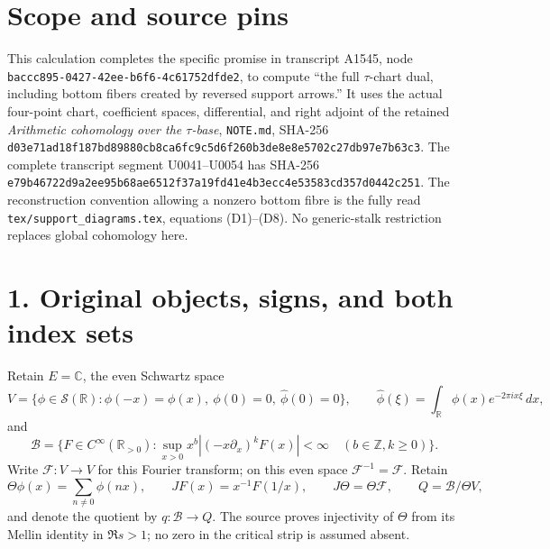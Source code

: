 


\section{Scope and source pins}\label{proof03:scope-and-source-pins}

This calculation completes the specific promise in transcript A1545,
node \texttt{baccc895-\allowbreak{}0427-\allowbreak{}42ee-\allowbreak{}b6f6-\allowbreak{}4c61752dfde2}, to compute ``the
full \ensuremath{\tau}-chart dual, including bottom fibers created by reversed support
arrows.'' It uses the actual four-point chart, coefficient spaces,
differential, and right adjoint of the retained \emph{Arithmetic
cohomology over the \ensuremath{\tau}-base}, \texttt{NOTE.md}, SHA-256
\texttt{d03e71ad\allowbreak{}18f187bd\allowbreak{}89880cb8\allowbreak{}ca6fc9c5\allowbreak{}d6f260b3\allowbreak{}de8e8e57\allowbreak{}02c27db9\allowbreak{}7e7b63c3}.
The complete transcript segment U0041--U0054 has SHA-256
\texttt{e79b4672\allowbreak{}2d9a2ee9\allowbreak{}5b68ae65\allowbreak{}12f37a19\allowbreak{}fd41e4b3\allowbreak{}ecc4e535\allowbreak{}83cd357d\allowbreak{}0442c251}.
The reconstruction convention allowing a nonzero bottom fibre is the
fully read \texttt{tex/\allowbreak{}support\_\allowbreak{}diagrams.tex}, equations (D1)--(D8). No
generic-stalk restriction replaces global cohomology here.

\section{1. Original objects, signs, and both index
sets}\label{proof03:original-objects-signs-and-both-index-sets}

Retain \(E=\mathbb C\), the even Schwartz space \[
V=\{\phi\in\mathcal S(\mathbb R):\phi(-x)=\phi(x),\ \phi(0)=0,\ \widehat\phi(0)=0\},
\qquad
\widehat\phi(\xi)=\int_{\mathbb R}\phi(x)e^{-2\pi i x\xi}\,dx,
\] and \[
\mathscr B=\{F\in C^\infty(\mathbb R_{>0}):
\sup_{x>0}x^b|(-x\partial_x)^kF(x)|<\infty\quad(b\in\mathbb Z,k\ge0)\}.
\] Write \(\mathcal F:V\to V\) for this Fourier transform; on this even
space \(\mathcal F^{-1}=\mathcal F\). Retain \[
\Theta\phi(x)=\sum_{n\ne0}\phi(nx),\qquad
JF(x)=x^{-1}F(1/x),\qquad J\Theta=\Theta\mathcal F,
\qquad Q=\mathscr B/\Theta V,
\] and denote the quotient by \(q:\mathscr B\to Q\). The source proves
injectivity of \(\Theta\) from its Mellin identity in \(\Re s>1\); no
zero in the critical strip is assumed absent.

